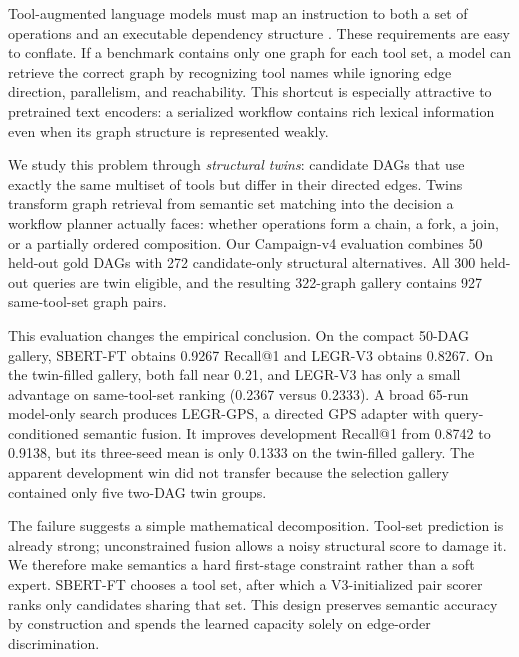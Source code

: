 \documentclass{article}
\newcommand{\sbert}{\textsc{SBERT-FT}}
\newcommand{\vthree}{\textsc{LEGR-V3}}
\newcommand{\gps}{\textsc{LEGR-GPS}}
\begin{document}
Tool-augmented language models must map an instruction to both a set of operations and an executable dependency structure \cite{schick2023toolformer,patil2023gorilla,qin2023toolllm,shen2023hugginggpt}.
These requirements are easy to conflate.
If a benchmark contains only one graph for each tool set, a model can retrieve the correct graph by recognizing tool names while ignoring edge direction, parallelism, and reachability.
This shortcut is especially attractive to pretrained text encoders: a serialized workflow contains rich lexical information even when its graph structure is represented weakly.

We study this problem through \emph{structural twins}: candidate DAGs that use exactly the same multiset of tools but differ in their directed edges.
Twins transform graph retrieval from semantic set matching into the decision a workflow planner actually faces: whether operations form a chain, a fork, a join, or a partially ordered composition.
Our Campaign-v4 evaluation combines 50 held-out gold DAGs with 272 candidate-only structural alternatives.
All 300 held-out queries are twin eligible, and the resulting 322-graph gallery contains 927 same-tool-set graph pairs.

This evaluation changes the empirical conclusion.
On the compact 50-DAG gallery, \sbert{} obtains 0.9267 Recall@1 and \vthree{} obtains 0.8267.
On the twin-filled gallery, both fall near 0.21, and \vthree{} has only a small advantage on same-tool-set ranking (0.2367 versus 0.2333).
A broad 65-run model-only search produces \gps{}, a directed GPS adapter with query-conditioned semantic fusion.
It improves development Recall@1 from 0.8742 to 0.9138, but its three-seed mean is only 0.1333 on the twin-filled gallery.
The apparent development win did not transfer because the selection gallery contained only five two-DAG twin groups.

The failure suggests a simple mathematical decomposition.
Tool-set prediction is already strong; unconstrained fusion allows a noisy structural score to damage it.
We therefore make semantics a hard first-stage constraint rather than a soft expert.
\sbert{} chooses a tool set, after which a V3-initialized pair scorer ranks only candidates sharing that set.
This design preserves semantic accuracy by construction and spends the learned capacity solely on edge-order discrimination.
\end{document}
